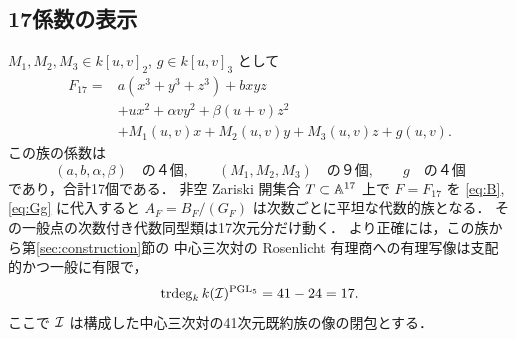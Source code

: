 \subsection{17係数の表示}
\begin{theorem}[17係数の横断的代数的族]\label{thm:17}
$M_1,M_2,M_3\in k[u,v]_2$, $g\in k[u,v]_3$ として
\begin{equation}\label{eq:F17}
\boxed{\begin{aligned}
 F_{17}={}&a(x^3+y^3+z^3)+bxyz\\
 &+ux^2+\alpha vy^2+\beta(u+v)z^2\\
 &+M_1(u,v)x+M_2(u,v)y+M_3(u,v)z+g(u,v).
\end{aligned}}
\end{equation}
この族の係数は
\begin{equation}\label{eq:count17}
 (a,b,\alpha,\beta)\quad\text{の４個},\qquad
 (M_1,M_2,M_3)\quad\text{の９個},\qquad
 g\quad\text{の４個}
\end{equation}
であり，合計17個である．
非空 Zariski 開集合 $T\subset\mathbb A^{17}$ 上で
$F=F_{17}$ を \eqref{eq:B}, \eqref{eq:Gg} に代入すると
$A_F=B_F/(G_F)$ は次数ごとに平坦な代数的族となる．
その一般点の次数付き代数同型類は17次元分だけ動く．
より正確には，この族から第\ref{sec:construction}節の
中心三次対の Rosenlicht 有理商への有理写像は支配的かつ一般に有限で，
\begin{equation}\label{eq:17mod}
 \operatorname{trdeg}_k k(\mathcal I)^{\mathrm{PGL}_5}=41-24=17.
\end{equation}
ここで $\mathcal I$ は構成した中心三次対の41次元既約族の像の閉包とする．
\end{theorem}
